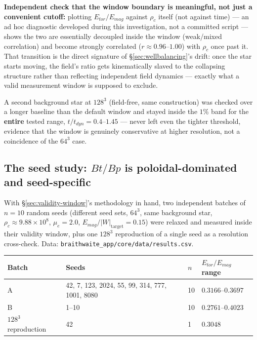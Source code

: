 \documentclass[11pt,a4paper]{scrartcl}
\newcommand{\code}[1]{\texttt{\small #1}}
\begin{document}
\textbf{Independent check that the window boundary is meaningful, not
just a convenient cutoff:} plotting $E_{tor}/E_{mag}$ against $\rho_c$
itself (not against time) --- an ad hoc diagnostic developed during
this investigation, not a committed script --- shows the two are
essentially decoupled inside the window (weak/mixed correlation) and
become strongly correlated ($r\approx0.96$--$1.00$) with $\rho_c$ once
past it. That transition is the direct signature of
\S\ref{sec:wellbalancing}'s drift: once the star starts moving, the
field's ratio gets kinematically slaved to the collapsing structure
rather than reflecting independent field dynamics --- exactly what a
valid measurement window is supposed to exclude.

A second background star at $128^3$ (field-free, same construction) was
checked over a longer baseline than the default window and stayed
inside the $1\%$ band for the \textbf{entire} tested range,
$t/t_{dyn}=0.4$--$1.45$ --- never left even the tighter threshold,
evidence that the window is genuinely conservative at higher
resolution, not a coincidence of the $64^3$ case.

\subsection{The seed study: \texorpdfstring{$Bt/Bp$}{Bt/Bp} is poloidal-dominated and seed-specific}
\label{sec:seed-study}

With \S\ref{sec:validity-window}'s methodology in hand, two independent
batches of $n=10$ random seeds (different seed sets, $64^3$, same
background star, $\rho_c\approx9.88\times10^8$, $\mu_e=2.0$,
$E_{mag}/|W|_{\text{target}}=0.15$) were relaxed and measured inside
their validity window, plus one $128^3$ reproduction of a single seed
as a resolution cross-check. Data:
\code{braithwaite\_app/core/data/results.csv}.

\begin{center}
\begin{tabular}{@{}p{2.6cm}p{6.0cm}p{1.2cm}p{3.0cm}@{}}
\toprule
Batch & Seeds & $n$ & $E_{tor}/E_{mag}$ range\\
\midrule
A & 42, 7, 123, 2024, 55, 99, 314, 777, 1001, 8080 & 10 & $0.3166$--$0.3697$\\
B & 1--10 & 10 & $0.2761$--$0.4023$\\
$128^3$ reproduction & 42 & 1 & $0.3048$\\
\bottomrule
\end{tabular}
\end{center}
\end{document}
